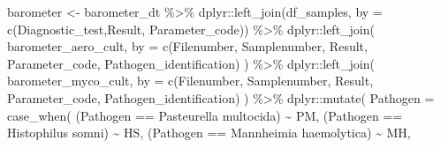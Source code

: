 \documentclass[
]{article}
\newenvironment{Shaded}{\begin{snugshade}}{\end{snugshade}}
\newcommand{\AttributeTok}[1]{\textcolor[rgb]{0.77,0.63,0.00}{#1}}
\newcommand{\FunctionTok}[1]{\textcolor[rgb]{0.00,0.00,0.00}{#1}}
\newcommand{\NormalTok}[1]{#1}
\newcommand{\OtherTok}[1]{\textcolor[rgb]{0.56,0.35,0.01}{#1}}
\newcommand{\SpecialCharTok}[1]{\textcolor[rgb]{0.00,0.00,0.00}{#1}}
\newcommand{\StringTok}[1]{\textcolor[rgb]{0.31,0.60,0.02}{#1}}
\begin{document}
\begin{Shaded}
\begin{Highlighting}[]
\NormalTok{barometer }\OtherTok{\textless{}{-}}
\NormalTok{  barometer\_dt }\SpecialCharTok{\%\textgreater{}\%}
\NormalTok{  dplyr}\SpecialCharTok{::}\FunctionTok{left\_join}\NormalTok{(df\_samples, }\AttributeTok{by =} \FunctionTok{c}\NormalTok{(}\StringTok{\textquotesingle{}Diagnostic\_test\textquotesingle{}}\NormalTok{,}\StringTok{\textquotesingle{}Result\textquotesingle{}}\NormalTok{, }\StringTok{\textquotesingle{}Parameter\_code\textquotesingle{}}\NormalTok{)) }\SpecialCharTok{\%\textgreater{}\%}
\NormalTok{  dplyr}\SpecialCharTok{::}\FunctionTok{left\_join}\NormalTok{(}
\NormalTok{      barometer\_aero\_cult, }\AttributeTok{by =} \FunctionTok{c}\NormalTok{(}\StringTok{\textquotesingle{}Filenumber\textquotesingle{}}\NormalTok{, }\StringTok{\textquotesingle{}Samplenumber\textquotesingle{}}\NormalTok{, }\StringTok{\textquotesingle{}Result\textquotesingle{}}\NormalTok{, }\StringTok{\textquotesingle{}Parameter\_code\textquotesingle{}}\NormalTok{, }\StringTok{\textquotesingle{}Pathogen\_identification\textquotesingle{}}\NormalTok{)}
\NormalTok{      ) }\SpecialCharTok{\%\textgreater{}\%}
\NormalTok{  dplyr}\SpecialCharTok{::}\FunctionTok{left\_join}\NormalTok{(}
\NormalTok{      barometer\_myco\_cult, }\AttributeTok{by =} \FunctionTok{c}\NormalTok{(}\StringTok{\textquotesingle{}Filenumber\textquotesingle{}}\NormalTok{, }\StringTok{\textquotesingle{}Samplenumber\textquotesingle{}}\NormalTok{, }\StringTok{\textquotesingle{}Result\textquotesingle{}}\NormalTok{, }\StringTok{\textquotesingle{}Parameter\_code\textquotesingle{}}\NormalTok{, }\StringTok{\textquotesingle{}Pathogen\_identification\textquotesingle{}}\NormalTok{)}
\NormalTok{  ) }\SpecialCharTok{\%\textgreater{}\%}
\NormalTok{  dplyr}\SpecialCharTok{::}\FunctionTok{mutate}\NormalTok{(}
      \AttributeTok{Pathogen =} \FunctionTok{case\_when}\NormalTok{(}
\NormalTok{      (Pathogen }\SpecialCharTok{==} \StringTok{\textquotesingle{}Pasteurella multocida\textquotesingle{}}\NormalTok{) }\SpecialCharTok{\textasciitilde{}} \StringTok{\textquotesingle{}PM\textquotesingle{}}\NormalTok{,}
\NormalTok{      (Pathogen }\SpecialCharTok{==} \StringTok{\textquotesingle{}Histophilus somni\textquotesingle{}}\NormalTok{) }\SpecialCharTok{\textasciitilde{}} \StringTok{\textquotesingle{}HS\textquotesingle{}}\NormalTok{,}
\NormalTok{      (Pathogen }\SpecialCharTok{==} \StringTok{\textquotesingle{}Mannheimia haemolytica\textquotesingle{}}\NormalTok{) }\SpecialCharTok{\textasciitilde{}} \StringTok{\textquotesingle{}MH\textquotesingle{}}\NormalTok{,}

\end{Highlighting}
\end{Shaded}
\end{document}

